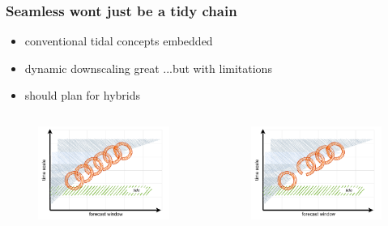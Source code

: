 \begin{frame}
\frametitle{Seamless wont just be a tidy chain}
\begin{minipage}{1.0\textwidth}
    \begin{itemize}
        \item conventional tidal concepts embedded
        \item dynamic downscaling great ...but with limitations
        \item should plan for hybrids
    \end{itemize}
\end{minipage}
\hfill
\begin{minipage}{1.0\textwidth}
\begin{columns}
    \begin{column}{0.4\textwidth}
    \begin{figure}      
        \includegraphics[width=\textwidth]{figures/diagrams/scales_with_chain.pdf}
    \end{figure}
    \end{column}

    \begin{column}{0.4\textwidth}
    \begin{figure}      
        \includegraphics[width=\textwidth]{figures/diagrams/scales_with_broken_chain.pdf}
    \end{figure}
    \end{column}
    

\end{columns}
\end{minipage}
\end{frame}
